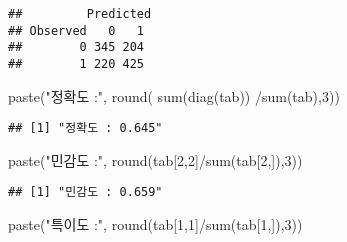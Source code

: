 \documentclass[
]{article}
\newenvironment{Shaded}{\begin{snugshade}}{\end{snugshade}}
\newcommand{\AttributeTok}[1]{\textcolor[rgb]{0.77,0.63,0.00}{#1}}
\newcommand{\DecValTok}[1]{\textcolor[rgb]{0.00,0.00,0.81}{#1}}
\newcommand{\FloatTok}[1]{\textcolor[rgb]{0.00,0.00,0.81}{#1}}
\newcommand{\FunctionTok}[1]{\textcolor[rgb]{0.00,0.00,0.00}{#1}}
\newcommand{\NormalTok}[1]{#1}
\newcommand{\OtherTok}[1]{\textcolor[rgb]{0.56,0.35,0.01}{#1}}
\newcommand{\SpecialCharTok}[1]{\textcolor[rgb]{0.00,0.00,0.00}{#1}}
\newcommand{\StringTok}[1]{\textcolor[rgb]{0.31,0.60,0.02}{#1}}
\begin{document}
\begin{Shaded}
\end{Shaded}

\begin{verbatim}
##         Predicted
## Observed   0   1
##        0 345 204
##        1 220 425
\end{verbatim}

\begin{Shaded}
\begin{Highlighting}[]
\FunctionTok{paste}\NormalTok{(}\StringTok{"정확도 :"}\NormalTok{, }\FunctionTok{round}\NormalTok{( }\FunctionTok{sum}\NormalTok{(}\FunctionTok{diag}\NormalTok{(tab)) }\SpecialCharTok{/}\FunctionTok{sum}\NormalTok{(tab),}\DecValTok{3}\NormalTok{))}
\end{Highlighting}
\end{Shaded}

\begin{verbatim}
## [1] "정확도 : 0.645"
\end{verbatim}

\begin{Shaded}
\begin{Highlighting}[]
\FunctionTok{paste}\NormalTok{(}\StringTok{"민감도 :"}\NormalTok{, }\FunctionTok{round}\NormalTok{(tab[}\DecValTok{2}\NormalTok{,}\DecValTok{2}\NormalTok{]}\SpecialCharTok{/}\FunctionTok{sum}\NormalTok{(tab[}\DecValTok{2}\NormalTok{,]),}\DecValTok{3}\NormalTok{))}
\end{Highlighting}
\end{Shaded}

\begin{verbatim}
## [1] "민감도 : 0.659"
\end{verbatim}

\begin{Shaded}
\begin{Highlighting}[]
\FunctionTok{paste}\NormalTok{(}\StringTok{"특이도 :"}\NormalTok{, }\FunctionTok{round}\NormalTok{(tab[}\DecValTok{1}\NormalTok{,}\DecValTok{1}\NormalTok{]}\SpecialCharTok{/}\FunctionTok{sum}\NormalTok{(tab[}\DecValTok{1}\NormalTok{,]),}\DecValTok{3}\NormalTok{))}
\end{Highlighting}
\end{Shaded}
\end{document}
